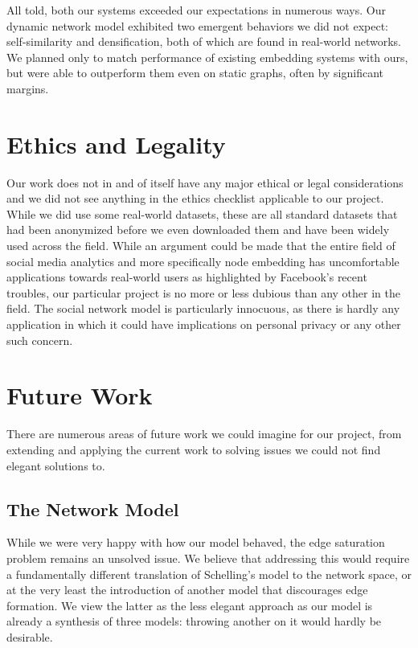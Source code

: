 \documentclass[12pt,twoside]{report}
\begin{document}
All told, both our systems exceeded our expectations in numerous ways. Our dynamic network model exhibited two emergent behaviors we did not expect: self-similarity and densification, both of which are found in real-world networks. We planned only to match performance of existing embedding systems with ours, but were able to outperform them even on static graphs, often by significant margins. \\

\section{Ethics and Legality}

Our work does not in and of itself have any major ethical or legal considerations and we did not see anything in the ethics checklist applicable to our project. While we did use some real-world datasets, these are all standard datasets that had been anonymized before we even downloaded them and have been widely used across the field. While an argument could be made that the entire field of social media analytics and more specifically node embedding has uncomfortable applications towards real-world users as highlighted by Facebook's recent troubles, our particular project is no more or less dubious than any other in the field. The social network model is particularly innocuous, as there is hardly any application in which it could have implications on personal privacy or any other such concern. \\

\section{Future Work}

There are numerous areas of future work we could imagine for our project, from extending and applying the current work to solving issues we could not find elegant solutions to. \\

\subsection{The Network Model}

While we were very happy with how our model behaved, the edge saturation problem remains an unsolved issue. We believe that addressing this would require a fundamentally different translation of Schelling's model to the network space, or at the very least the introduction of another model that discourages edge formation. We view the latter as the less elegant approach as our model is already a synthesis of three models: throwing another on it would hardly be desirable. \\
\end{document}
